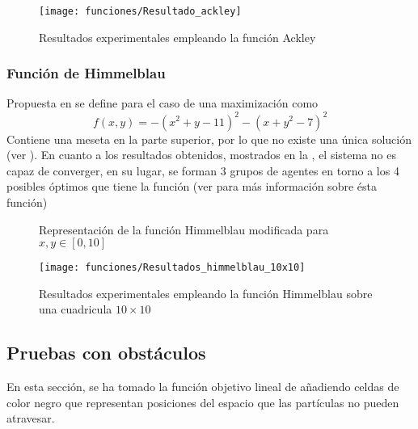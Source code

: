 	\begin{figure}[htbp]
	    \centering
	    \texttt{[image: funciones/Resultado\_ackley]}
	    \caption{Resultados experimentales empleando la función Ackley}
	    \label{fig:3}
	\end{figure}
	
	\subsubsection{Función de Himmelblau} Propuesta en \cite{HimmelblauFunction} se define para el caso de una maximización como
	\[  f(x,y)=-(x^2 + y - 11)^2 - (x + y^2 - 7)^2  \]
	Contiene una meseta en la parte superior, por lo que no existe una única solución (ver ).
	En cuanto a los resultados obtenidos, mostrados en la , el sistema no es capaz de converger, en su lugar, se forman 3 grupos de agentes en torno a los 4 posibles óptimos que tiene la función (ver \cite{WebFuncionesOptimizacion} para más información sobre ésta función)
	
	
	\begin{figure}[htbp]
	    \centering
	    \caption{Representación de la función Himmelblau modificada para $x,y\in[0,10]$}
	    \label{fig:4}
	\end{figure}
	
	\begin{figure}[htbp]
	    \centering
	    \texttt{[image: funciones/Resultados\_himmelblau\_10x10]}
	    \caption{Resultados experimentales empleando la función Himmelblau sobre una cuadricula $10\times10$}
	    \label{fig:5}
	\end{figure}
	
	\subsection{Pruebas con obstáculos}
	
	En esta sección, se ha tomado la función objetivo lineal de \cite{initialPaper} añadiendo celdas de color negro que representan posiciones del espacio que las partículas no pueden atravesar.
	

